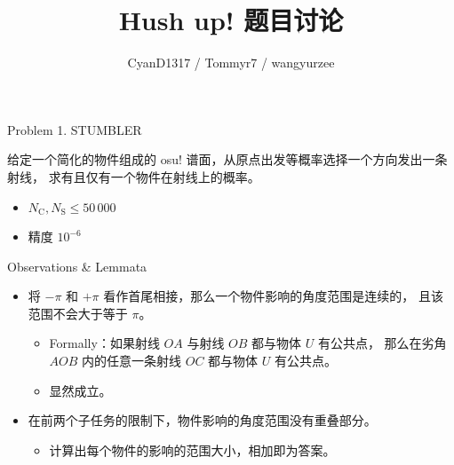 \documentclass[UTF8]{beamer}
\begin{document}
\title{Hush up! 题目讨论}
\author{CyanD1317 / Tommyr7 / wangyurzee}
\frame{\titlepage}


\begin{frame}{Problem 1. STUMBLER}

给定一个简化的物件组成的 osu! 谱面，从原点出发等概率选择一个方向发出一条射线，%
求有且仅有一个物件在射线上的概率。

\begin{itemize}
    \item $N_\mathrm{C}, N_\mathrm{S} \leq 50\,000$
    \item 精度 $10^{-6}$
\end{itemize}

\end{frame}

\begin{frame}{Observations \& Lemmata}

\begin{itemize}
\item
    将 $-\pi$ 和 $+\pi$ 看作首尾相接，那么一个物件影响的角度范围是连续的，%
    且该范围不会大于等于 $\pi$。
    \begin{itemize}
        \pause
        \item Formally：如果射线 $OA$ 与射线 $OB$ 都与物体 $U$ 有公共点，
            那么在劣角 $AOB$ 内的任意一条射线 $OC$ 都与物体 $U$ 有公共点。
        \pause
        \item 显然成立。
    \end{itemize}
\pause
\item
    在前两个子任务的限制下，物件影响的角度范围没有重叠部分。
    \begin{itemize}
        \pause
        \item 计算出每个物件的影响的范围大小，相加即为答案。
    \end{itemize}
\end{itemize}

\end{frame}
\end{document}

